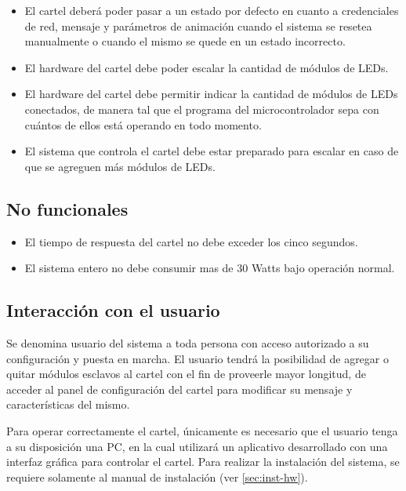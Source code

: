 \begin{itemize}
	\item El cartel deberá poder pasar a un estado por defecto en cuanto a credenciales de red, mensaje y parámetros de animación cuando el sistema se resetea manualmente o cuando el mismo se quede en un estado incorrecto.
	\item El hardware del cartel debe poder escalar la cantidad de módulos de LEDs.
	\item El hardware del cartel debe permitir indicar la cantidad de módulos de LEDs conectados, de manera tal que el programa del microcontrolador sepa con cuántos de ellos está operando en todo momento.
	\item El sistema que controla el cartel debe estar preparado para escalar en caso de que se agreguen más módulos de LEDs.
\end{itemize}

\subsection{No funcionales}
\begin{itemize}
	\item El tiempo de respuesta del cartel no debe exceder los cinco segundos.
	\item El sistema entero no debe consumir mas de 30 Watts bajo operación normal.
\end{itemize}

\subsection{Interacción con el usuario}
	
	Se denomina usuario del sistema a toda persona con acceso autorizado a su configuración y puesta en marcha.	El usuario tendrá la posibilidad de agregar o quitar módulos esclavos al cartel con el fin de proveerle mayor longitud, de acceder al panel de configuración del cartel para modificar su mensaje y características del mismo.
	
	Para operar correctamente el cartel, únicamente es necesario que el usuario tenga a su disposición una PC, en la cual utilizará un aplicativo desarrollado con una interfaz gráfica para controlar el cartel. Para realizar la instalación del sistema, se requiere solamente al manual de instalación (ver \ref{sec:inst-hw}).

